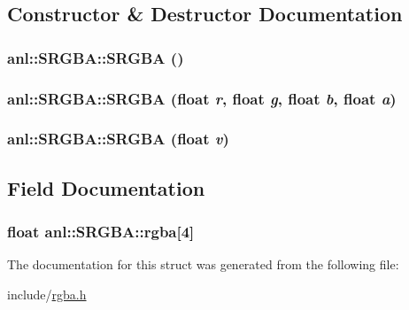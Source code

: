 \subsection{Constructor \& Destructor Documentation}
\hypertarget{structanl_1_1SRGBA_a36c6e2b0d09b52558847b97248ed7b87}{
\subsubsection[{SRGBA}]{\setlength{\rightskip}{0pt plus 5cm}anl::SRGBA::SRGBA ()}}
\label{structanl_1_1SRGBA_a36c6e2b0d09b52558847b97248ed7b87}
\hypertarget{structanl_1_1SRGBA_acea341abcd19bb068dfd85ffee77899c}{
\subsubsection[{SRGBA}]{\setlength{\rightskip}{0pt plus 5cm}anl::SRGBA::SRGBA (float {\em r}, \/  float {\em g}, \/  float {\em b}, \/  float {\em a})}}
\label{structanl_1_1SRGBA_acea341abcd19bb068dfd85ffee77899c}
\hypertarget{structanl_1_1SRGBA_a1304b087913212baac85d0511636c9d7}{
\subsubsection[{SRGBA}]{\setlength{\rightskip}{0pt plus 5cm}anl::SRGBA::SRGBA (float {\em v})}}
\label{structanl_1_1SRGBA_a1304b087913212baac85d0511636c9d7}


\subsection{Field Documentation}
\hypertarget{structanl_1_1SRGBA_ac3ed4480953fb956b1f3ba41868567ff}{
\subsubsection[{rgba}]{\setlength{\rightskip}{0pt plus 5cm}float {\bf anl::SRGBA::rgba}\mbox{[}4\mbox{]}}}
\label{structanl_1_1SRGBA_ac3ed4480953fb956b1f3ba41868567ff}


The documentation for this struct was generated from the following file:\begin{DoxyCompactItemize}
\item 
include/\hyperlink{rgba_8h}{rgba.h}\end{DoxyCompactItemize}
